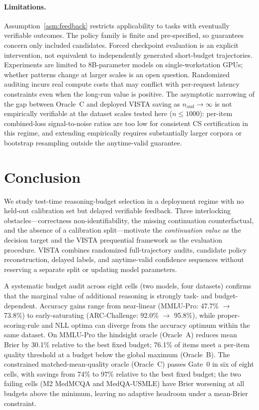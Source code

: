 \documentclass[a4paper,fleqn]{cas-sc}
\theoremstyle{plain}
\theoremstyle{definition}
\theoremstyle{remark}
\begin{document}
\paragraph{Limitations.}
Assumption~\ref{asm:feedback} restricts applicability to tasks with eventually
verifiable outcomes. The policy family is finite and pre-specified, so
guarantees concern only included candidates. Forced checkpoint evaluation is an
explicit intervention, not equivalent to independently generated short-budget
trajectories. Experiments are limited to 8B-parameter models on
single-workstation GPUs; whether patterns change at larger scales is an open
question. Randomized auditing incurs real compute costs that may conflict
with per-request latency constraints even when the long-run value is positive.
The asymptotic narrowing of the gap between Oracle~C and deployed VISTA
saving as $n_{\mathrm{aud}}\!\to\!\infty$ is not empirically verifiable at
the dataset scales tested here ($n\leq 1000$): per-item combined-loss
signal-to-noise ratios are too low for consistent CS certification in this
regime, and extending empirically requires substantially larger corpora or
bootstrap resampling outside the anytime-valid guarantee.

\section{Conclusion}

We study test-time reasoning-budget selection in a deployment regime with no
held-out calibration set but delayed verifiable feedback. Three interlocking
obstacles---correctness non-identifiability, the missing continuation
counterfactual, and the absence of a calibration split---motivate the
\emph{continuation value} as the decision target and the VISTA
prequential framework as the evaluation procedure. VISTA combines randomized
full-trajectory audits, candidate policy reconstruction, delayed labels, and
anytime-valid confidence sequences without reserving a separate split or
updating model parameters.

A systematic budget audit across eight cells (two models, four datasets)
confirms that the marginal value of additional reasoning is strongly
task- and budget-dependent.
Accuracy gains range from near-linear (MMLU-Pro: 47.7\% $\to$ 73.8\%) to
early-saturating (ARC-Challenge: 92.0\% $\to$ 95.8\%), while proper-scoring-rule
and NLL optima can diverge from the accuracy optimum within the same dataset.
On MMLU-Pro the hindsight oracle (Oracle~A) reduces mean Brier by 30.1\%
relative to the best fixed budget; 76.1\% of items meet a per-item quality
threshold at a budget below the global maximum (Oracle~B).
The constrained matched-mean-quality oracle (Oracle~C) passes Gate~0 in
six of eight cells, with savings from 74\% to 97\% relative to the best fixed
budget; the two failing cells (M2 MedMCQA and MedQA-USMLE) have Brier
worsening at all budgets above the minimum, leaving no adaptive headroom
under a mean-Brier constraint.
\end{document}
